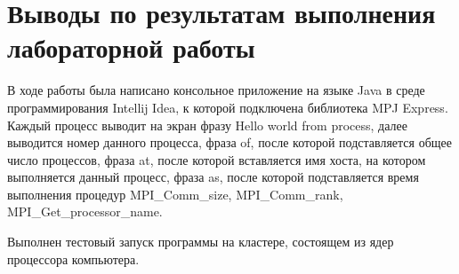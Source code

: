 \documentclass[titlepage,oneside,final,14pt]{extarticle} %
\begin{document}
\section{Выводы по результатам выполнения лабораторной работы}

В ходе работы была написано консольное приложение на языке Java в среде программирования Intellij Idea, к которой подключена библиотека MPJ Express. Каждый процесс
выводит на экран фразу Hello world from process, далее выводится номер
данного процесса, фраза of, после которой подставляется общее число
процессов, фраза at, после которой вставляется имя хоста, на котором
выполняется данный процесс, фраза as, после которой подставляется время выполнения процедур MPI\_Comm\_size, MPI\_Comm\_rank, MPI\_Get\_processor\_name.

Выполнен тестовый запуск программы на кластере, состоящем из ядер процессора компьютера.
\end{document}
